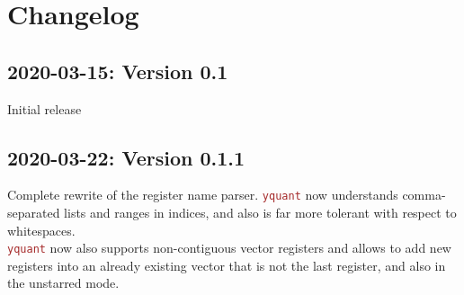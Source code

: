 \documentclass{scrartcl}
\makeatletter
\def\pkg#1{\textcolor{brown}{\texttt{#1}}}
\def\Yquant{\pkg{yquant}}
\newcommand*{\the@orig@section}{}
\let\the@orig@section=\section
\renewcommand*{\section}{%
   \clearpage%
   \the@orig@section%
}
\makeatother
\begin{document}

   \section{Changelog}
      \subsection*{2020-03-15: Version 0.1}
         Initial release

      \subsection*{2020-03-22: Version 0.1.1}
         Complete rewrite of the register name parser.
         \Yquant{} now understands comma\hyp separated lists and ranges in indices, and also is far more tolerant with respect to whitespaces. \\
         \Yquant{} now also supports non\hyp contiguous vector registers and allows to add new registers into an already existing vector that is not the last register, and also in the unstarred mode.
\end{document}
